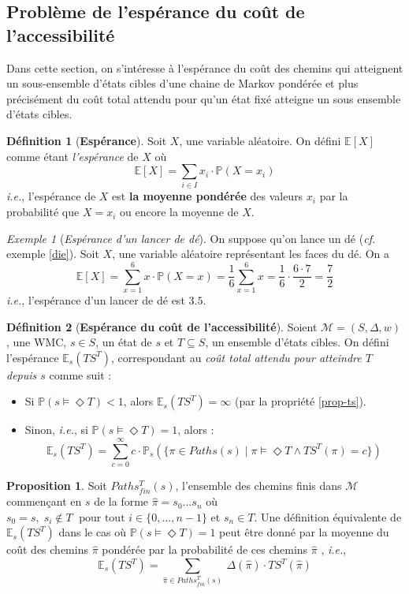 \documentclass[12pt,a4paper]{report}
\theoremstyle{definition}%
\newtheorem{definition}{Définition}[chapter]
\newtheorem{proposition}{Proposition}[chapter]
\theoremstyle{remark}
\newtheorem{example}{Exemple}[chapter]
\newcommand{\ie}{\textit{i.e.}, }
\newcommand{\cf}{\textit{cf.} }
\newcommand{\pr}{\mathbb{P}}
\let\labelitemi\labelitemii
\begin{document}
\subsection{Problème de l'espérance du coût de l'accessibilité}
Dans cette section, on s'intéresse à l'espérance du coût des chemins qui atteignent un sous-ensemble d'états cibles d'une chaine de Markov pondérée et plus précisément du coût total attendu pour qu'un état fixé atteigne un sous ensemble d'états cibles.
\begin{definition}[\textbf{Espérance}]
	Soit $X$, une variable aléatoire. On défini $\mathbb{E}[X]$ comme étant \textit{l'espérance} de $X$ où 
	\[\mathbb{E}[X] = \sum_{i \in I}x_i \cdot \pr(X = x_i) \]
	\ie l'espérance de $X$ est \textbf{la moyenne pondérée} des valeurs $x_i$ par la probabilité que $X = x_i$ ou encore la moyenne de $X$.
	\cite{Course2}
\end{definition}
\begin{example}[\textit{Espérance d'un lancer de dé}]
	On suppose qu'on lance un dé (\cf exemple \ref{die}). Soit $X$, une variable aléatoire représentant les faces du dé. On a 
	\[ \mathbb{E}[X] = \sum_{x = 1}^6 x \cdot \pr(X = x)  = \frac{1}{6} \sum_{x = 1}^6 x = \frac{1}{6} \cdot \frac{6 \cdot 7}{2} = \frac{7}{2}\] \ie l'espérance d'un lancer de dé est $3.5$.
\end{example}

\begin{definition}[\textbf{Espérance du coût de l'accessibilité}]
	Soient $\mathcal{M} = (S, \Delta, w)$, une WMC, $s \in S$, un état de $s$ et $T \subseteq S$, un ensemble d'états cibles. On défini l'espérance $\mathbb{E}_s(TS^T)$, correspondant au \textit{coût total attendu pour atteindre $T$ depuis $s$} comme suit :
	\begin{itemize}
	\renewcommand{\labelitemi}{\tiny$\bullet$}
	\item 	Si $\pr(s \models \Diamond T) < 1$, alors $\mathbb{E}_s(TS^T) = \infty$ (par la propriété \ref{prop-ts}).
	\item Sinon, \ie si $\pr(s \models \Diamond T) = 1$, alors :
	\[ \mathbb{E}_s(TS^T) = \sum_{c = 0}^\infty c \cdot \pr_s(\{\pi \in Paths(s) \; | \; \pi \models \Diamond T \wedge TS^T(\pi) = c \})\]
	\end{itemize}
\end{definition}

\begin{proposition}
			Soit $Paths_{fin}^T(s)$, l'ensemble des chemins finis dans $\mathcal{M}$ commençant en $s$ de la forme $\hat{\pi} = s_0 \dots s_n$ où $s_0 = s, \;  s_i \notin T \; \text{ pour tout } i \in \{0, \dots, n-1\}$ et $s_n \in T$. Une définition équivalente de $\mathbb{E}_s(TS^T)$ dans le cas où $\pr(s \models \Diamond T) = 1$ peut être donné par la moyenne du coût des chemins $\hat{\pi}$ pondérée par la probabilité de ces chemins $\hat{\pi}$ %
	, \ie
	\[\mathbb{E}_s(TS^T) = \sum_{\hat{\pi} \in Paths_{fin}^T(s)}\ \Delta(\hat{\pi}) \cdot TS^T(\hat{\pi})\]
\end{proposition}
\end{document}

